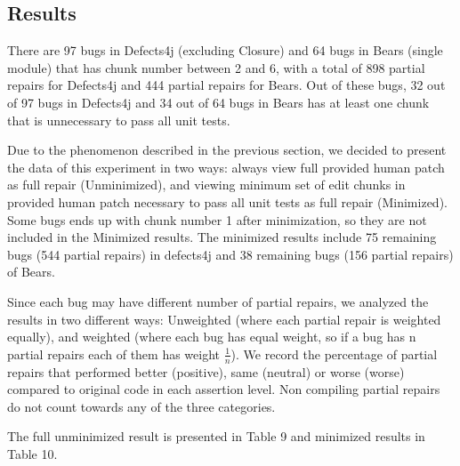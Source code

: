 \documentclass[sigconf, timestamp-false, anonymous=true]{acmart}
\begin{document}
\subsection{Results}

There are 97 bugs in Defects4j (excluding Closure) and 64 bugs 
in Bears (single module) that has chunk number between 2 and 6, with
a total of 898 partial repairs for Defects4j and 444 partial repairs for Bears.
Out of these bugs, 32 out of 97 bugs in Defects4j and 
34 out of 64 bugs in Bears has at least one chunk that
is unnecessary to pass all unit tests.

Due to the phenomenon described in the previous section, we decided to present the
data of this experiment in two ways: always view full provided human patch as full repair
(Unminimized), and viewing minimum set of edit chunks in provided human patch necessary
to pass all unit tests as full repair (Minimized).
Some bugs ends up with chunk number 1 after minimization, 
so they are not included in the Minimized results. The minimized results 
include 75 remaining bugs (544 partial repairs) in defects4j and 38 remaining bugs (156 partial repairs) of Bears. 

Since each bug may have different 
number of partial repairs, we analyzed the results in two different ways: 
Unweighted (where each partial repair is weighted equally), and weighted (where each bug 
has equal weight, so if a bug has n partial repairs each of them has weight 
$\frac{1}{n}$). We record the percentage of partial repairs that performed better (positive), same (neutral)
or worse (worse) compared to original code in each assertion level. Non compiling
partial repairs do not count towards any of the three categories.

The full unminimized result is presented in Table 9 and minimized results in Table 10.
\end{document}
